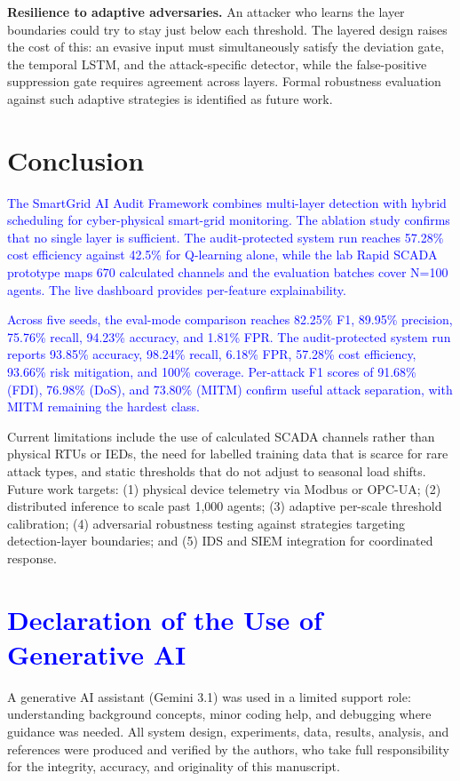 \documentclass[conference,a4paper]{IEEEtran}
\begin{document}
\textbf{Resilience to adaptive adversaries.} An attacker who learns the layer boundaries could try to stay just below each threshold. The layered design raises the cost of this: an evasive input must simultaneously satisfy the deviation gate, the temporal LSTM, and the attack-specific detector, while the false-positive suppression gate requires agreement across layers. Formal robustness evaluation against such adaptive strategies is identified as future work.

\section{Conclusion}

\textcolor{blue}{The SmartGrid AI Audit Framework combines multi-layer detection with hybrid scheduling for cyber-physical smart-grid monitoring. The ablation study confirms that no single layer is sufficient. The audit-protected system run reaches 57.28\% cost efficiency against 42.5\% for Q-learning alone, while the lab Rapid SCADA prototype maps 670 calculated channels and the evaluation batches cover N=100 agents. The live dashboard provides per-feature explainability.}

\textcolor{blue}{Across five seeds, the eval-mode comparison reaches 82.25\% F1, 89.95\% precision, 75.76\% recall, 94.23\% accuracy, and 1.81\% FPR. The audit-protected system run reports 93.85\% accuracy, 98.24\% recall, 6.18\% FPR, 57.28\% cost efficiency, 93.66\% risk mitigation, and 100\% coverage. Per-attack F1 scores of 91.68\% (FDI), 76.98\% (DoS), and 73.80\% (MITM) confirm useful attack separation, with MITM remaining the hardest class.}

Current limitations include the use of calculated SCADA channels rather than physical RTUs or IEDs, the need for labelled training data that is scarce for rare attack types, and static thresholds that do not adjust to seasonal load shifts. Future work targets: (1) physical device telemetry via Modbus or OPC-UA; (2) distributed inference to scale past 1,000 agents; (3) adaptive per-scale threshold calibration; (4) adversarial robustness testing against strategies targeting detection-layer boundaries; and (5) IDS and SIEM integration for coordinated response.

\section*{\textcolor{blue}{Declaration of the Use of Generative AI}}
A generative AI assistant (Gemini 3.1) was used in a limited support role: understanding background concepts, minor coding help, and debugging where guidance was needed. All system design, experiments, data, results, analysis, and references were produced and verified by the authors, who take full responsibility for the integrity, accuracy, and originality of this manuscript.
\end{document}
